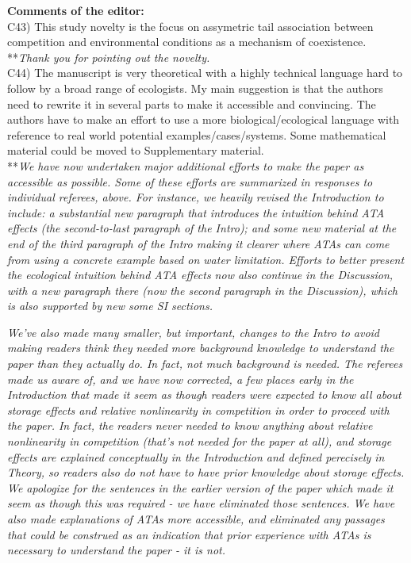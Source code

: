 \documentclass[letterpaper,11pt]{article}
\begin{document}
\noindent \textbf{Comments of the editor:} \\

\noindent C43) This study novelty is the focus on assymetric tail association between competition and environmental conditions as a mechanism of coexistence. \\

\noindent ***\emph{Thank you for pointing out the novelty.} \\

\noindent C44) The manuscript is very theoretical with a highly technical language hard to follow by a broad range of ecologists. My main suggestion is that the authors need to rewrite it in several parts to make it accessible and convincing. The authors have to make an effort to use a more biological/ecological language with reference to real world potential examples/cases/systems. Some mathematical material could be moved to Supplementary material. \\

\noindent ***\emph{We have now undertaken major additional efforts to make the paper as accessible as possible.
Some of these efforts are summarized in responses to individual referees, above. For instance, we
heavily revised the Introduction to include: a substantial new paragraph that introduces the intuition behind
ATA effects (the second-to-last paragraph of the Intro); and some new material at the end of the third paragraph
of the Intro making it clearer where ATAs can come from using a concrete example based on water limitation.
Efforts to better present the ecological intuition behind ATA effects now also continue in the Discussion, with a new 
paragraph there (now the second paragraph in the Discussion), which is also supported by new some SI sections. }

\emph{We've also made many smaller, but important, changes to the Intro to avoid making readers think they needed
more background knowledge to understand the paper than they actually do. In fact, not much background is
needed. The referees made us aware of, and we have now corrected, a few places early in the Introduction that
made it seem as though readers were expected to know all about storage effects and relative nonlinearity in
competition in order to proceed with the paper. In fact, the readers never needed to know anything about relative 
nonlinearity in competition (that's not needed for the paper at all), and storage effects are explained conceptually
in the Introduction and defined perecisely in Theory, so readers also do not have to have prior knowledge about
storage effects. We apologize for the sentences in the earlier version of the paper which made it seem as though
this was required - we have eliminated those sentences. We have also made explanations of ATAs more accessible,
and eliminated any passages that could be construed as an indication that prior experience with ATAs is 
necessary to understand the paper - it is not.}
\end{document}
